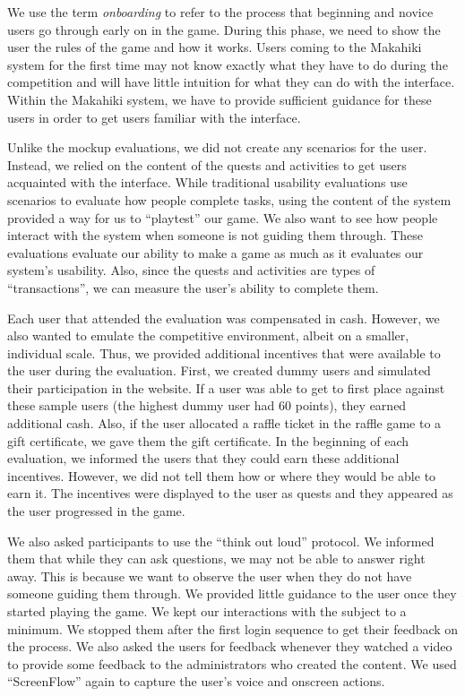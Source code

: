 We use the term \emph{onboarding} to refer to the process that beginning and novice users go through early on in the game.  During this phase, we need to show the user the rules of the game and how it works.  Users coming to the Makahiki system for the first time may not know exactly what they have to do during the competition and will have little intuition for what they can do with the interface.  Within the Makahiki system, we have to provide sufficient guidance for these users in order to get users familiar with the interface.

Unlike the mockup evaluations, we did not create any scenarios for the user.  Instead, we relied on the content of the quests and activities to get users acquainted with the interface.  While traditional usability evaluations use scenarios to evaluate how people complete tasks, using the content of the system provided a way for us to ``playtest'' our game. We also want to see how people interact with the system when someone is not guiding them through. These evaluations evaluate our ability to make a game as much as it evaluates our system's usability. Also, since the quests and activities are types of ``transactions'', we can measure the user's ability to complete them.

Each user that attended the evaluation was compensated in cash.  However, we also wanted to emulate the competitive environment, albeit on a smaller, individual scale.  Thus, we provided additional incentives that were available to the user during the evaluation. First, we created dummy users and simulated their participation in the website. If a user was able to get to first place against these sample users (the highest dummy user had 60 points), they earned additional cash.  Also, if the user allocated a raffle ticket in the raffle game to a gift certificate, we gave them the gift certificate.  In the beginning of each evaluation, we informed the users that they could earn these additional incentives.  However, we did not tell them how or where they would be able to earn it. The incentives were displayed to the user as quests and they appeared as the user progressed in the game.

We also asked participants to use the ``think out loud'' protocol.  We informed them that while they can ask questions, we may not be able to answer right away.  This is because we want to observe the user when they do not have someone guiding them through.  We provided little guidance to the user once they started playing the game.  We kept our interactions with the subject to a minimum. We stopped them after the first login sequence to get their feedback on the process.  We also asked the users for feedback whenever they watched a video to provide some feedback to the administrators who created the content. We used ``ScreenFlow'' again to capture the user's voice and onscreen actions.

